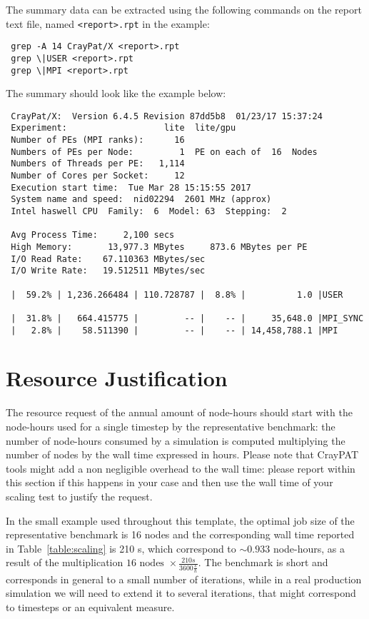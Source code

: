 \documentclass[11pt]{article}
\begin{document}
The summary data can be extracted using the following commands on the report text file, named \verb!<report>.rpt! in the example:
\begin{verbatim}
 grep -A 14 CrayPat/X <report>.rpt
 grep \|USER <report>.rpt
 grep \|MPI <report>.rpt
\end{verbatim}

The summary should look like the example below: 
\begin{verbatim}
 CrayPat/X:  Version 6.4.5 Revision 87dd5b8  01/23/17 15:37:24
 Experiment:                   lite  lite/gpu     
 Number of PEs (MPI ranks):      16
 Numbers of PEs per Node:         1  PE on each of  16  Nodes
 Numbers of Threads per PE:   1,114
 Number of Cores per Socket:     12
 Execution start time:  Tue Mar 28 15:15:55 2017
 System name and speed:  nid02294  2601 MHz (approx)
 Intel haswell CPU  Family:  6  Model: 63  Stepping:  2
 
 Avg Process Time:     2,100 secs             
 High Memory:       13,977.3 MBytes     873.6 MBytes per PE
 I/O Read Rate:    67.110363 MBytes/sec       
 I/O Write Rate:   19.512511 MBytes/sec
 
 |  59.2% | 1,236.266484 | 110.728787 |  8.8% |          1.0 |USER
 
 |  31.8% |   664.415775 |         -- |    -- |     35,648.0 |MPI_SYNC
 |   2.8% |    58.511390 |         -- |    -- | 14,458,788.1 |MPI
\end{verbatim}

\section{Resource Justification}
The resource request of the annual amount of node-hours should start with the node-hours used for a single timestep 
by the representative benchmark: the number of node-hours consumed by a simulation is computed multiplying 
the number of nodes by the wall time expressed in hours. 
Please note that CrayPAT tools might add a non negligible overhead to the wall time: please report within this section 
if this happens in your case and then use the wall time of your scaling test to justify the request.

In the small example used throughout this template, the optimal job size of the representative benchmark is 16 nodes and 
the corresponding wall time reported in Table~\ref{table:scaling} is 210 s, which correspond to $\sim 0.933$ node-hours, 
as a result of the multiplication $16 \mbox { nodes } \times \frac{210 s}{3600 \frac{s}{h}}$. 
The benchmark is short and corresponds in general to a small number of iterations, while in a real production simulation 
we will need to extend it to several iterations, that might correspond to timesteps or an equivalent measure. 
\end{document}
